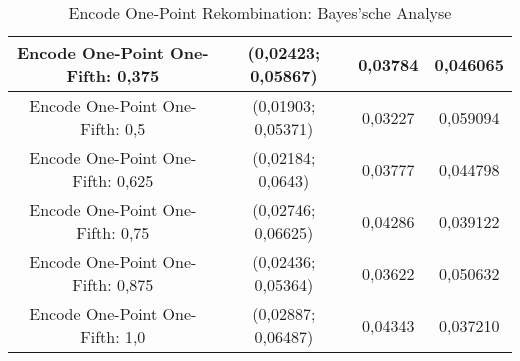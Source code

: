 \begin{table}[H]
\begin{tabular}{c | c | c | c}
		\hline
		Encode One-Point One-Fifth: 0,375 & (0,02423; 0,05867) & 0,03784 & 0,046065\\
		\hline
		Encode One-Point One-Fifth: 0,5 & (0,01903; 0,05371) & 0,03227 & 0,059094\\
		\hline
		Encode One-Point One-Fifth: 0,625 & (0,02184; 0,0643) & 0,03777 & 0,044798\\
		\hline
		Encode One-Point One-Fifth: 0,75 & (0,02746; 0,06625) & 0,04286 & 0,039122\\
		\hline
		Encode One-Point One-Fifth: 0,875 & (0,02436; 0,05364) & 0,03622 & 0,050632\\
		\hline
		Encode One-Point One-Fifth: 1,0 & (0,02887; 0,06487) & 0,04343 & 0,037210\\
		
	\end{tabular}
	\label{table:encodeOnePointBayesian}
	\caption{Encode One-Point Rekombination: Bayes'sche Analyse}
\end{table}

